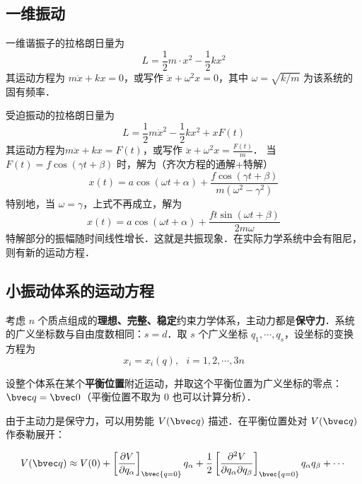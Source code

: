 

\subsection{一维振动}
一维谐振子的拉格朗日量为
\begin{equation}
L=\frac{1}{2}m\cdot{x}^2-\frac{1}{2}kx^2
\end{equation}
其运动方程为 $m\ddot {x}+kx=0$，或写作 $\ddot{x}+\omega^2 x=0$，其中 $\omega=\sqrt{k/m}$ 为该系统的固有频率．

受迫振动的拉格朗日量为 
\begin{equation}
L=\frac{1}{2}m\dot{x}^2-\frac{1}{2}kx^2+xF(t)
\end{equation}
其运动方程为$m\ddot{x}+kx=F(t)$，或写作 $\ddot{x}+\omega^2 x=\frac{F(t)}{m}$．
当 $F(t)=f\cos(\gamma t+\beta)$ 时，解为（齐次方程的通解+特解）
\begin{equation}
x(t)=a\cos(\omega t+\alpha)+\frac{f\cos(\gamma t+\beta)}{m(\omega^2-\gamma^2)}
\end{equation}
特别地，当 $\omega=\gamma$，上式不再成立，解为
\begin{equation}
x(t)=a \cos(\omega t+\alpha)+\frac{ft \sin(\omega t+\beta)}{2m\omega}
\end{equation}
特解部分的振幅随时间线性增长．这就是共振现象．在实际力学系统中会有阻尼，则有新的运动方程．

\subsection{小振动体系的运动方程}
考虑 $n$ 个质点组成的\textbf{理想、完整、稳定}约束力学体系，主动力都是\textbf{保守力}．系统的广义坐标数与自由度数相同：$s=d$．取 $s$ 个广义坐标 $q_1,\cdots,q_s$，设坐标的变换方程为
\begin{equation}
x_i = x_i(q),\ \ \  i=1,2,\cdots,3n
\end{equation}

设整个体系在某个\textbf{平衡位置}附近运动，并取这个平衡位置为广义坐标的零点：$\bvec q=\bvec 0$（平衡位置不取为 $0$ 也可以计算分析）．

由于主动力是保守力，可以用势能 $V(\bvec q)$ 描述．在平衡位置处对 $V(\bvec q)$ 作泰勒展开：

\begin{equation}
V(\bvec q)\approx V(0)+\left[\frac{\partial V}{\partial q_\alpha}\right]_\bvec {q=0} q_\alpha+\frac{1}{2}\left[\frac{\partial^2V}{\partial q_\alpha\partial q_\beta}\right]_\bvec{q=0}q_\alpha q_\beta+\cdots
\end{equation}


